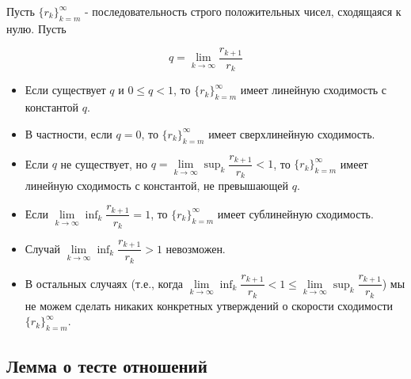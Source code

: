 \documentclass[
  russian,
  letterpaper,
  DIV=11,
  numbers=noendperiod]{scrartcl}
\providecommand{\tightlist}{%
  \setlength{\itemsep}{0pt}\setlength{\parskip}{0pt}}
\begin{document}
Пусть \(\{r_k\}_{k=m}^\infty\) - последовательность строго положительных
чисел, сходящаяся к нулю. Пусть

\[
q = \lim_{k \to \infty} \dfrac{r_{k+1}}{r_k}
\]

\begin{itemize}
\tightlist
\item
  Если существует \(q\) и \(0 \leq q <  1\), то \(\{r_k\}_{k=m}^\infty\)
  имеет линейную сходимость с константой \(q\).
\item
  В частности, если \(q = 0\), то \(\{r_k\}_{k=m}^\infty\) имеет
  сверхлинейную сходимость.
\item
  Если \(q\) не существует, но
  \(q = \lim\limits_{k \to \infty} \sup_k \dfrac{r_{k+1}}{r_k} <  1\),
  то \(\{r_k\}_{k=m}^\infty\) имеет линейную сходимость с константой, не
  превышающей \(q\).
\item
  Если \(\lim\limits_{k \to \infty} \inf_k \dfrac{r_{k+1}}{r_k} =1\), то
  \(\{r_k\}_{k=m}^\infty\) имеет сублинейную сходимость.
\item
  Случай \(\lim\limits_{k \to \infty} \inf_k \dfrac{r_{k+1}}{r_k} > 1\)
  невозможен.
\item
  В остальных случаях (т.е., когда
  \(\lim\limits_{k \to \infty} \inf_k \dfrac{r_{k+1}}{r_k} <  1 \leq  \lim\limits_{k \to \infty} \sup_k \dfrac{r_{k+1}}{r_k}\))
  мы не можем сделать никаких конкретных утверждений о скорости
  сходимости \(\{r_k\}_{k=m}^\infty\).
\end{itemize}

\subsection{Лемма о тесте
отношений}\label{ux43bux435ux43cux43cux430-ux43e-ux442ux435ux441ux442ux435-ux43eux442ux43dux43eux448ux435ux43dux438ux439}
\end{document}
